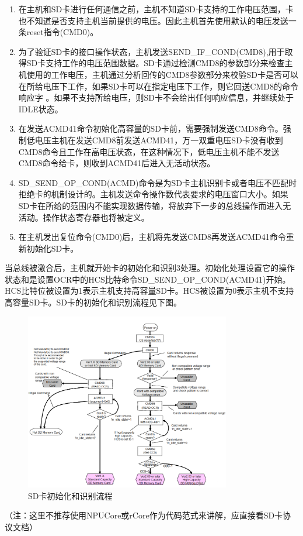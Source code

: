 \begin{enumerate}
	\item 在主机和SD卡进行任何通信之前，主机不知道SD卡支持的工作电压范围，卡也不知道是否支持主机当前提供的电压。因此主机首先使用默认的电压发送一条reset指令(CMD0)。
	\item 为了验证SD卡的接口操作状态，主机发送SEND\_IF\_COND(CMD8),用于取得SD卡支持工作的电压范围数据。SD卡通过检测CMD8的参数部分来检查主机使用的工作电压，主机通过分析回传的CMD8参数部分来校验SD卡是否可以在所给电压下工作，如果SD卡可以在指定电压下工作，则它回送CMD8的命令响应字 。如果不支持所给电压，则SD卡不会给出任何响应信息，并继续处于IDLE状态。
	\item 在发送ACMD41命令初始化高容量的SD卡前，需要强制发送CMD8命令。强制低电压主机在发送CMD8前发送ACMD41，万一双重电压SD卡没有收到CMD8命令且工作在高电压状态，在这种情况下，低电压主机不能不发送CMD8命令给卡，则收到ACMD41后进入无活动状态。
	\item SD\_SEND\_OP\_COND(ACMD)命令是为SD卡主机识别卡或者电压不匹配时拒绝卡的机制设计的。主机发送命令操作数代表要求的电压窗口大小。如果SD卡在所给的范围内不能实现数据传输，将放弃下一步的总线操作而进入无活动。操作状态寄存器也将被定义。
	\item 在主机发出复位命令(CMD0)后，主机将先发送CMD8再发送ACMD41命令重新初始化SD卡。
\end{enumerate}

当总线被激合后，主机就开始卡的初始化和识别3处理。初始化处理设置它的操作状态和是设置OCR中的HCS比特命令SD\_SEND\_OP\_COND(ACMD41)开始。HCS比特位被设置为1表示主机支持高容量SD卡。HCS被设置为0表示主机不支持高容量SD卡。SD卡的初始化和识别流程见下图。

\begin{figure}[H]
    \centering
    \includegraphics[width=0.8\textwidth]{figures/06-02-初始化.png}
    \caption{SD卡初始化和识别流程}
\end{figure}
（注：这里不推荐使用NPUCore或rCore作为代码范式来讲解，应直接看SD卡协议文档）

